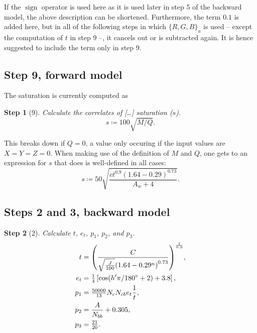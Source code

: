 \documentclass[twocolumn]{scrartcl}
\theoremstyle{named}
\newtheorem*{step}{Step}
\DeclareMathOperator{\sign}{sign}
\begin{document}
If the $\sign$ operator is used here as it is used later in step 5 of the
backward model, the above description can be shortened.
Furthermore, the term $0.1$ is added here, but in all of the following steps in
which $\{R,G,B\}_a$ is used -- except the computation of $t$ in step 9 --, it
cancels out or is subtracted again. It is hence suggested to include the term
only in step 9.

\subsection{Step 9, forward model}

The saturation is currently computed as
\begin{step}[9]
  Calculate the correlates of [\dots] saturation ($s$).
  \[
    s \coloneqq 100 \sqrt{M/Q}.
  \]
\end{step}
This breaks down if $Q=0$, a value only occuring if the input values are
$X=Y=Z=0$. When making use of the definition of $M$ and $Q$, one gets to an
expression for $s$ that does is well-defined in all cases:
\[
  s \coloneqq 50 \sqrt{\frac{c t^{0.9} {(1.64-0.29)}^{0.73}}{A_w + 4}}.
\]


\subsection{Steps 2 and 3, backward model}

\begin{step}[2]
Calculate $t$, $e_t$, $p_1$, $p_2$, and $p_3$.
\begin{align*}
  t &= {\left(\frac{C}{\sqrt{\frac{J}{100}} {(1.64 - 0.29^n)}^{0.73}}\right)}^\frac{1}{0.9},\\
  e_t &= \tfrac{1}{4} \left[\cos(h'\pi/180\degree + 2) + 3.8\right],\\
  p_1 &= \tfrac{50000}{13} N_c N_{cb} e_t \frac{1}{t},\\
  p_2 &= \frac{A}{N_{bb}} + 0.305,\\
  p_3 &= \tfrac{21}{20}.
\end{align*}
\end{step}
\end{document}
